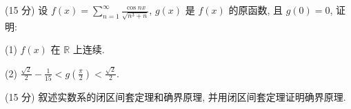 (15 分) 设 $f(x) = \sum_{n=1}^{\infty} \frac{\cos nx}{\sqrt{n^3 + n}}$, $g(x)$ 是 $f(x)$ 的原函数, 且 $g(0) = 0$, 证明:\par
(1) $f(x)$ 在 $\mathbb{R}$ 上连续.\par
(2) $\frac{\sqrt{2}}{2} - \frac{1}{15} < g\left(\frac{\pi}{2}\right) < \frac{\sqrt{2}}{2}$.\par
(15 分) 叙述实数系的闭区间套定理和确界原理, 并用闭区间套定理证明确界原理.\par
